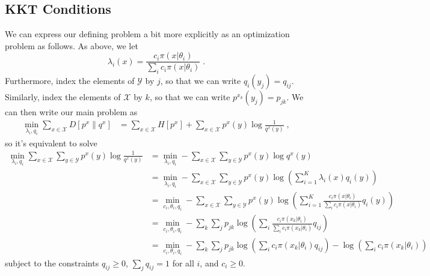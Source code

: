\documentclass[english]{scrartcl}
\begin{document}
	\subsection{KKT Conditions}
		We can express our defining problem a bit more explicitly as an optimization problem as follows. As above, we let 
		\begin{equation}
			\lambda_i(x) = \frac{c_i\pi(x|\theta_i)}{\sum_ic_i\pi(x|\theta_i)}\;.
		\end{equation}
		Furthermore, index the elements of $\mathcal{Y}$ by $j$, so that we can write $q_i(y_j) = q_{ij}$. Similarly, index the elements of $\mathcal{X}$ by $k$, so that we can write $p^{x_k}(y_j) = p_{jk}$. We can then write our main problem as 
		\begin{align}
			\min_{\lambda_i, q_i} \sum_{x \in \mathcal{X}} D[p^x\|q^x] &= \sum_{x\in \mathcal{X}} H[p^x] + \sum_{x \in \mathcal{X}}p^x(y)\log\frac{1}{q^x(y)}\;,
		\end{align}
		so it's equivalent to solve 
		\begin{align}
			\min_{\lambda_i, q_i}\sum_{x \in \mathcal{X}}\sum_{y \in \mathcal{Y}} p^x(y)\log\frac{1}{q^x(y)} &= \min_{\lambda_i, q_i} - \sum_{x \in \mathcal{X}} \sum_{y \in \mathcal{Y}} p^x(y)\log q^x(y) \\
			&= \min_{\lambda_i, q_i} - \sum_{x \in \mathcal{X}} \sum_{y \in \mathcal{Y}} p^x(y)\log \left(\sum_{i=1}^K \lambda_i(x) q_i(y)\right) \\
			&= \min_{c_i, \theta_i, q_i} - \sum_{x \in \mathcal{X}}\sum_{y \in \mathcal{Y}}p^x(y)\log \left(\sum_{i=1}^K \frac{c_i\pi(x|\theta_i)}{\sum_ic_i\pi(x|\theta_i)} q_i(y)\right) \\
			&= \min_{c_i, \theta_i, q_i} - \sum_{k}\sum_{j}p_{jk}\log \left(\sum_{i} \frac{c_i\pi(x_k|\theta_i)}{\sum_ic_i\pi(x_k|\theta_i)} q_{ij}\right) \\
			&= \min_{c_i, \theta_i, q_i} - \sum_{k}\sum_{j}p_{jk}\log \left(\sum_{i} c_i\pi(x_k|\theta_i) q_{ij}\right) - \log\left(\sum_ic_i\pi(x_k|\theta_i) \right)
		\end{align}
		subject to the constraints $q_{ij} \geq 0$, $\sum_jq_{ij} = 1$ for all $i$, and $c_i \geq 0$. 


\end{document}
